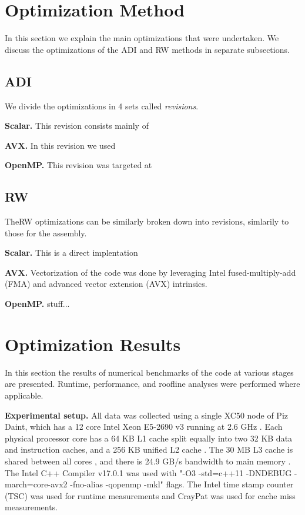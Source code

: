 \documentclass[letterpaper]{article}
\newcommand{\mypar}[1]{{\bf #1.}}
\begin{document}
\section{Optimization Method}\label{sec:method}

In this section we explain the main optimizations that were undertaken.
We discuss the optimizations of the ADI and RW methods in separate subsections.

\subsection{ADI}\label{subsec:ADI_method}

We divide the optimizations in 4 sets called \textit{revisions}.

\mypar{Scalar}
This revision consists mainly of 

\mypar{AVX}
In this revision we used

\mypar{OpenMP}
This revision was targeted at 


\subsection{RW}\label{subsec:RW_method}

TheRW optimizations can be similarly broken down into revisions, simlarily to those for the assembly.

\mypar{Scalar}
This is a direct implentation

\mypar{AVX}
Vectorization of the code was done by leveraging Intel fused-multiply-add (FMA) and advanced vector extension (AVX) intrinsics.

\mypar{OpenMP}
stuff...


\section{Optimization Results}\label{sec:results}

In this section the results of numerical benchmarks of the code at various stages are presented. Runtime, performance, and roofline analyses were performed where applicable.

\mypar{Experimental setup}
All data was collected using a single XC50 node of Piz Daint, which has a 12 core Intel Xeon E5-2690 v3 running at 2.6 GHz \cite{daint}. Each physical processor core has a 64 KB L1 cache split equally into two 32 KB data and instruction caches, and a 256 KB unified L2 cache \cite{cpu_world}. The 30 MB L3 cache is shared between all cores \cite{ark_intel}, and there is 24.9 GB/s bandwidth to main memory \cite{7_cpu}. The Intel C++ Compiler v17.0.1 was used with "-O3 -std=c++11 -DNDEBUG -march=core-avx2 -fno-alias -qopenmp -mkl" flags. The Intel time stamp counter (TSC) was used for runtime measurements and CrayPat was used for cache miss measurements.
\end{document}
